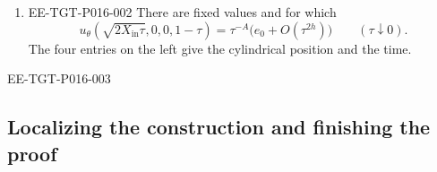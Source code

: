 \begin{theorem}
\begin{enumerate}[label=\textup{(\roman*)},leftmargin=*]
%
\begin{EESegment}{EE-TGT-P016-001}
In this statement, the second input of  is
. Later, the notation  means the same
field evaluated at .
\end{EESegment}

\item
\begin{EESegment}{EE-TGT-P016-002}
There are fixed values  and
 for which
\begin{equation}
u_\theta(\sqrt{2X_{\mathrm{in}}\tau},0,0,1-\tau)
=\tau^{-A}\bigl(e_0+O(\tau^{2h})\bigr)
\qquad(\tau\downarrow0).
\tag{3.6}\label{eq:3.6}
\end{equation}
The four entries on the left give the cylindrical position and the time.
\end{EESegment}
\end{enumerate}
\end{theorem}

\begin{EESegment}{EE-TGT-P016-003}
\subsection{Localizing the construction and finishing the proof}\label{sec:3.5}
\end{EESegment}

